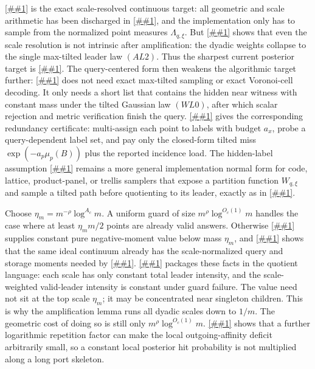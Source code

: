 \documentclass[10pt]{article}
\newcommand{\cref}[1]{\ref{##1}}
\newcommand{\Cref}[1]{\ref{##1}}
\theoremstyle{definition}
\begin{document}
\Cref{asm:ideal-likelihood-leader-law-sampler} is the exact scale-resolved
continuous target: all geometric and scale arithmetic has been discharged in
\cref{lem:ideal-likelihood-leader-law}, and the implementation only has to
sample from the normalized point measures \(\Lambda_{q,\xi}\).  But
\cref{lem:scale-amplified-alpha-leader} shows that even the scale resolution is
not intrinsic after amplification: the dyadic weights collapse to the single
max-tilted leader law \((AL2)\).  Thus the sharpest current posterior target is
\cref{asm:alpha-leader-sampler}.  The query-centered form then weakens the
algorithmic target further: \cref{lem:smoothed-witness-list-compiler} does not
need exact max-tilted sampling or exact Voronoi-cell decoding.  It only needs a
short list that contains the hidden near witness with constant mass under the
tilted Gaussian law \((WL0)\), after which scalar rejection and metric
verification finish the query.  \Cref{lem:poisson-rate-coverage} gives the
corresponding redundancy certificate: multi-assign each point to labels with
budget \(a_x\), probe a query-dependent label set, and pay only the closed-form
tilted miss \(\exp(-a_p\mu_p(B))\) plus the reported incidence load.  The
hidden-label assumption
\cref{asm:normalized-likelihood-leader-sampler} remains a more general
implementation normal form for code, lattice, product-panel, or trellis
samplers that expose a partition function \(W_{q,\xi}\) and sample a tilted
path before quotienting to its leader, exactly as in
\cref{lem:compressed-aggregate-sampler}.

Choose $\eta_m=m^{-\rho}\log^{A_c}m$. A uniform guard of size $m^\rho\log^{O_c(1)}m$ handles the case where at least $\eta_m m/2$ points are already valid answers. Otherwise \cref{thm:continuous-likelihood-balls} supplies constant pure negative-moment value below mass $\eta_m$, and \cref{lem:ideal-likelihood-scale-profile} shows that the same ideal continuum already has the scale-normalized query and storage moments needed by \cref{lem:dyadic-structured-amplification}. \Cref{lem:ideal-likelihood-leader-law} packages these facts in the quotient language: each scale has only constant total leader intensity, and the scale-weighted valid-leader intensity is constant under guard failure. The value need not sit at the top scale $\eta_m$; it may be concentrated near singleton children. This is why the amplification lemma runs all dyadic scales down to $1/m$. The geometric cost of doing so is still only $m^\rho\log^{O_c(1)}m$. \Cref{cor:dyadic-affinity-boost} shows that a further logarithmic repetition factor can make the local outgoing-affinity deficit arbitrarily small, so a constant local posterior hit probability is not multiplied along a long port skeleton.
\end{document}
